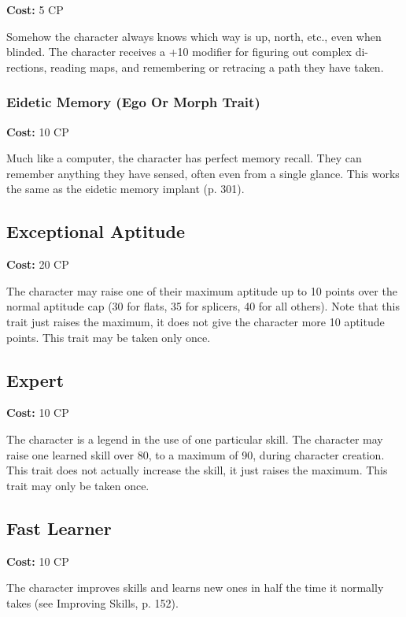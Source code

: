 \textbf{Cost:} 5 CP 

Somehow the character always knows which way is up, north, etc., even when blinded. The character receives a +10 modifier for figuring out complex di- rections, reading maps, and remembering or retracing a path they have taken. 





\subsubsection{Eidetic Memory (Ego Or Morph Trait)} \label{sec:traits-eidetic-memory} \textbf{Cost:} 10 CP 

Much like a computer, the character has perfect memory recall. They can remember anything they have sensed, often even from a single glance. This works the same as the eidetic memory implant (p. 301). 

\subsection{Exceptional Aptitude} \label{sec:traits-exceptional-aptitude} 

\textbf{Cost:} 20 CP 

The character may raise one of their maximum aptitude up to 10 points over the normal aptitude cap (30 for flats, 35 for splicers, 40 for all others). Note that this trait just raises the maximum, it does not give the character more 10 aptitude points. This trait may be taken only once. 

\subsection{Expert} \label{sec:traits-expert} 

\textbf{Cost:} 10 CP 

The character is a legend in the use of one particular skill. The character may raise one learned skill over 80, to a maximum of 90, during character creation. This trait does not actually increase the skill, it just raises the maximum. This trait may only be taken once. 

\subsection{Fast Learner} \label{sec:traits-fast-learnier} 

\textbf{Cost:} 10 CP 

The character improves skills and learns new ones in half the time it normally takes (see Improving Skills, p. 152). 

